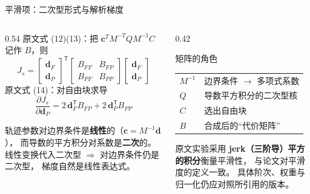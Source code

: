 \begin{frame}{平滑项：二次型形式与解析梯度}
  \small
  \begin{columns}[t]
    \begin{column}{0.54\textwidth}
      原文式 (12)(13)：把 $\mathbf c^T M^{-T}QM^{-1}C$ 记作 $B$，则
      \[
        J_s=
        \begin{bmatrix}\mathbf d_F\\ \mathbf d_P\end{bmatrix}^{\!\mathsf T}
        \begin{bmatrix}B_{FF}&B_{FP}\\ B_{PF}&B_{PP}\end{bmatrix}
        \begin{bmatrix}\mathbf d_F\\ \mathbf d_P\end{bmatrix}
      \]
      原文式 (14)：对自由块求导
      \[
        \frac{\partial J_s}{\partial\mathbf d_P}
        =2\,\mathbf d_F^{\mathsf T}B_{FP}+2\,\mathbf d_P^{\mathsf T}B_{PP}
      \]
      \begin{reading}[闭式梯度的来源]
        \scriptsize
        轨迹参数对边界条件是\textbf{线性}的（$\mathbf c=M^{-1}\mathbf d$），
        而导数的平方积分对系数是\textbf{二次}的。
        线性变换代入二次型 $\Rightarrow$ 对边界条件仍是二次型，
        梯度自然是线性表达式。
      \end{reading}
    \end{column}
    \begin{column}{0.42\textwidth}
      \begin{block}{矩阵的角色}
        \footnotesize
        \begin{tabular}{@{}ll@{}}
          \toprule
          $M^{-1}$ & 边界条件 $\to$ 多项式系数 \\
          $Q$ & 导数平方积分的二次型核 \\
          $C$ & 选出自由块 \\
          $B$ & 合成后的“代价矩阵” \\
          \bottomrule
        \end{tabular}
      \end{block}
      \begin{reading}[用哪一阶导数]
        \small
        原文实验采用\textbf{ jerk（三阶导）平方的积分}衡量平滑性，
        与论文对平滑度的定义一致。
        具体阶次、权重与归一化仍应对照所引用的版本。
      \end{reading}
    \end{column}
  \end{columns}
\end{frame}

